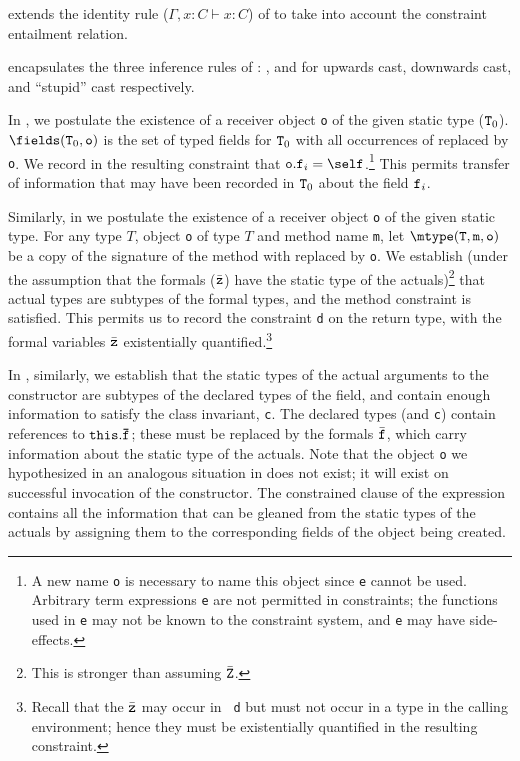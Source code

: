 \TVar{} extends the identity rule ($\Gamma, x:C \vdash x:C$) of
\FJ{} to take into account the constraint entailment relation.

\TCast{} encapsulates the three inference rules of \FJ{}:
\TUCast{}, \TDCast{} and \TSCast{} for upwards cast, downwards cast, and ``stupid'' cast respectively. 


In \TField, we postulate the existence of a receiver object {\tt o} of
the given static type (${\tt T}_0$). $\fields({\tt T}_0,{\tt o})$ is
the set of typed fields for ${\tt T}_0$ with all occurrences of 
\this{} replaced  by {\tt o}. We record in the resulting
constraint that ${\tt o.f}_i=\self$.\footnote{A new name {\tt o} is
necessary to name this object since {\tt e} cannot be used. Arbitrary
term expressions {\tt e} are not permitted in constraints; the
functions used in {\tt e} may not be known to the constraint system,
and {\tt e} may have side-effects.}  This permits transfer of
information that may have been recorded in ${\tt T}_0$ about the field
${\tt f}_i$. 

Similarly, in \TInvk{} we postulate the existence of a receiver object
{\tt o} of the given static type. For any type $T$, object {\tt o} of
type $T$ and method name {\tt m}, let $\mtype({\tt T},{\tt m},{\tt
o})$ be a copy of the signature of the method with \this{} replaced by
{\tt o}. We establish (under the assumption that the formals
($\bar{\tt z}$) have the static type of the actuals)\footnote{This is
stronger than assuming $\bar{\tt Z}$.}  that actual types are subtypes
of the formal types, and the method constraint is satisfied. This
permits us to record the constraint {\tt d} on the return type, with
the formal variables $\bar{\tt z}$ existentially
quantified.\footnote{Recall that the $\bar{\tt z}$ may occur in {\tt
d} but must not occur in a type in the calling environment; hence they
must be existentially quantified in the resulting constraint.}

In \TNew, similarly, we establish that the static types of the actual
arguments to the constructor are subtypes of the declared types of the
field, and contain enough information to satisfy the class invariant,
{\tt c}. The declared types (and {\tt c}) contain references to ${\tt
this.\bar{\tt f}}$; these must be replaced by the formals $\bar{\tt
f}$, which carry information about the static type of the
actuals. Note that the object {\tt o} we hypothesized in an analogous
situation in \TInvk{} does not exist; it will exist on successful
invocation of the constructor. The constrained clause of the \new{}
expression contains all the information that can be gleaned from the
static types of the actuals by assigning them to the corresponding
fields of the object being created.

